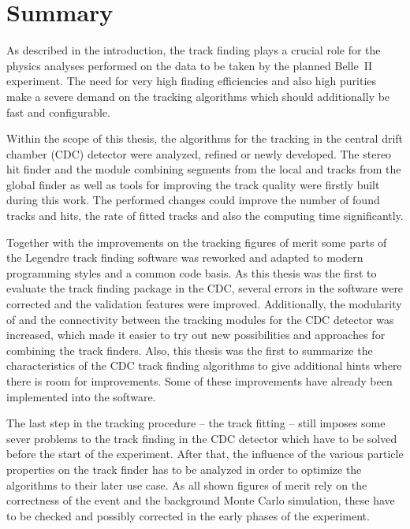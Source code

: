 \chapter*{Summary}

As described in the introduction, the track finding plays a crucial role for the physics analyses performed on the data to be taken by the planned Belle~II experiment. The need for very high finding efficiencies and also high purities make a severe demand on the tracking algorithms which should additionally be fast and configurable.

Within the scope of this thesis, the algorithms for the tracking in the central drift chamber (CDC) detector were analyzed, refined or newly developed. The stereo hit finder and the module combining segments from the local and tracks from the global finder as well as tools for improving the track quality were firstly built during this work. The performed changes could improve the number of found tracks and hits, the rate of fitted tracks and also the computing time significantly.

Together with the improvements on the tracking figures of merit some parts of the Legendre track finding software was reworked and adapted to modern programming styles and a common code basis. As this thesis was the first to evaluate the track finding package in the CDC, several errors in the software were corrected and the validation features were improved. Additionally, the modularity of and the connectivity between the tracking modules for the CDC detector was increased, which made it easier to try out new possibilities and approaches for combining the track finders. Also, this thesis was the first to summarize the characteristics of the CDC track finding algorithms to give additional hints where there is room for improvements. Some of these improvements have already been implemented into the software.

The last step in the tracking procedure -- the track fitting -- still imposes some sever problems to the track finding in the CDC detector which have to be solved before the start of the experiment. After that, the influence of the various particle properties on the track finder has to be analyzed in order to optimize the algorithms to their later use case. As all shown figures of merit rely on the correctness of the event and the background Monte Carlo simulation, these have to be checked and possibly corrected in the early phases of the experiment.


